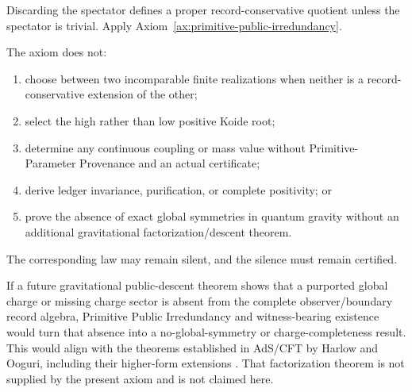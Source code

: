 \begin{proofsketch}
Discarding the spectator defines a proper record-conservative quotient unless the
spectator is trivial.  Apply Axiom~\ref{ax:primitive-public-irredundancy}.
\end{proofsketch}

\begin{proposition}
\label{prop:ppi-boundary}
The axiom does not:
\begin{enumerate}[label=\textup{(\roman*)},leftmargin=2.2em]
\item choose between two incomparable finite realizations when neither is a
      record-conservative extension of the other;
\item select the high rather than low positive Koide root;
\item determine any continuous coupling or mass value without
      Primitive-Parameter Provenance and an actual certificate;
\item derive ledger invariance, purification, or complete positivity; or
\item prove the absence of exact global symmetries in quantum gravity without an
      additional gravitational factorization/descent theorem.
\end{enumerate}
The corresponding law may remain silent, and the silence must remain certified.
\end{proposition}

\begin{remark}
If a future gravitational public-descent theorem shows that a purported global
charge or missing charge sector is absent from the complete observer/boundary record
algebra, Primitive Public Irredundancy and witness-bearing existence would turn that
absence into a no-global-symmetry or charge-completeness result.  This would align
with the theorems established in AdS/CFT by Harlow and Ooguri, including their
higher-form extensions \cite{harlow-ooguri-letter,harlow-ooguri-full}.  That
factorization theorem is not supplied by the present axiom and is not claimed here.
\end{remark}

